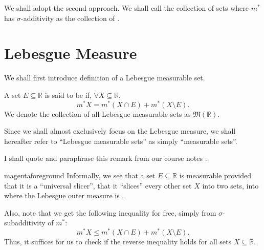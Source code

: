 \documentclass[notoc,notitlepage]{tufte-book}
\begin{document}
We shall adopt the second approach. We shall call the collection of sets where
$m^*$ has $\sigma$-additivity as the collection of .


\section{Lebesgue Measure}%
\label{sec:lebesgue_measure}

We shall first introduce  definition of a Lebesgue
measurable set.

\begin{defn}\label{defn:lebesgue_measureable_set}
  A set $E \subseteq \mathbb{R}$ is said to be  if,
  $\forall X \subseteq \mathbb{R}$,
  \begin{equation*}
    m^* X = m^* ( X \cap E ) + m^* (X \setminus E).
  \end{equation*}
  We denote the collection of all Lebesgue measurable sets as
  $\mathfrak{M}(\mathbb{R})$.
\end{defn}

\begin{remark}
  Since we shall almost exclusively focus on the Lebesgue measure, we shall
  hereafter refer to ``Lebesgue measurable sets'' as simply ``measurable sets''.
\end{remark}

\begin{note}
  I shall quote and paraphrase this remark from our course notes
  \cite{marcoux2019}:
  \begin{quotebox}{magenta}{foreground}
    Informally, we see that a set $E \subseteq \mathbb{R}$ is measurable
    provided that it is a ``universal slicer'', that it ``slices'' every other
    set $X$ into two  sets, into where the Lebesgue outer
    measure is .
  \end{quotebox}

  Also, note that we get the following inequality for free, simply from
  $\sigma$-subadditivity of $m^*$:
  \begin{equation*}
    m^* X \leq m^* (X \cap E) + m^* (X \setminus E).
  \end{equation*}
  Thus, it suffices for us to check if the reverse inequality holds for all sets
  $X \subseteq \mathbb{R}$.
\end{note}
\end{document}
